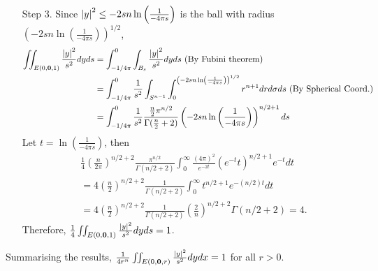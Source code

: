 \documentclass{article}
\begin{document}
\begin{enumerate}
    \item[Step 3.] Since $\abs{y}^2\leq -2sn\ln\left(\frac{1}{-4\pi s}\right)$ is the ball with radius $\left(-2sn\ln\left(\frac{1}{-4\pi s}\right)\right)^{1/2}$, 
    \begin{equation*}
    \begin{split}
        \iint_{E(0, \bm{0}, 1)} \frac{\abs{y}^2}{s^2}dyds&=\int_{-1/4\pi}^0\int_{B_s}\frac{\abs{y}^2}{s^2}dyds \text{ (By Fubini theorem)}\\
        &=\int_{-1/4\pi}^0 \frac{1}{s^2} \int_{S^{n-1}}\int_0^{\left(-2sn\ln\left(\frac{1}{-4\pi s}\right)\right)^{1/2}} r^{n+1}drd\sigma ds \text{ (By Spherical Coord.)}\\
        &=\int_{-1/4\pi}^0 \frac{1}{s^2}\frac{\frac{n}{2}\pi^{n/2}}{\Gamma(\frac{n}{2}+2)} \left(-2sn\ln\left(\frac{1}{-4\pi s}\right)\right)^{n/2+1} ds
    \end{split}
    \end{equation*}
    Let $t=\ln\left(\frac{1}{-4\pi s}\right)$, then 
    \begin{equation*}
        \begin{split}
            &\frac{1}{4}\left(\frac{n}{2\pi}\right)^{n/2+2}\frac{\pi^{n/2}}{\Gamma(n/2+2)}\int_{0}^\infty \frac{(4\pi)^2}{e^{-2t}} \left(e^{-t}t\right)^{n/2+1} e^{-t}dt \\
            &=4\left(\frac{n}{2}\right)^{n/2+2}\frac{1}{\Gamma(n/2+2)}\int_0^\infty t^{n/2+1}e^{-(n/2)t}dt \\
            &=4\left(\frac{n}{2}\right)^{n/2+2}\frac{1}{\Gamma(n/2+2)}\left(\frac{2}{n}\right)^{n/2+2}\Gamma(n/2+2)=4.
        \end{split}
    \end{equation*}
    Therefore, $\frac{1}{4}\iint_{E(0, \bm{0}, 1)} \frac{\abs{y}^2}{s^2}dyds=1$.
\end{enumerate}
Summarising the results, $\frac{1}{4r^n}\iint_{E(0, \bm{0}, r)}\frac{\abs{y}^2}{s^2}dydx=1$ for all $r>0$.
\end{document}
